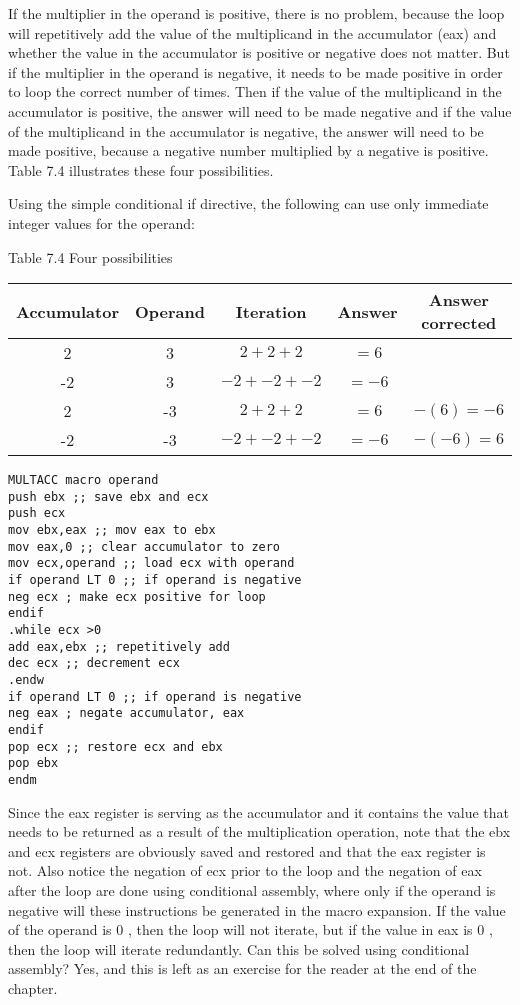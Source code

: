 \documentclass[10pt]{article}
\begin{document}
If the multiplier in the operand is positive, there is no problem, because the loop will repetitively add the value of the multiplicand in the accumulator (eax) and whether the value in the accumulator is positive or negative does not matter. But if the multiplier in the operand is negative, it needs to be made positive in order to loop the correct number of times. Then if the value of the multiplicand in the accumulator is positive, the answer will need to be made negative and if the value of the multiplicand in the accumulator is negative, the answer will need to be made positive, because a negative number multiplied by a negative is positive. Table 7.4 illustrates these four possibilities.

Using the simple conditional if directive, the following can use only immediate integer values for the operand:

Table 7.4 Four possibilities

\begin{center}
\begin{tabular}{|c|c|c|c|c|}
\hline
Accumulator & Operand & Iteration & Answer & Answer corrected \\
\hline
2 & 3 & $2+2+2$ & $=6$ &  \\
\hline
-2 & 3 & $-2+-2+-2$ & $=-6$ &  \\
\hline
2 & -3 & $2+2+2$ & $=6$ & $-(6)=-6$ \\
\hline
-2 & -3 & $-2+-2+-2$ & $=-6$ & $-(-6)=6$ \\
\hline
\end{tabular}
\end{center}

\begin{verbatim}
MULTACC macro operand
push ebx ;; save ebx and ecx
push ecx
mov ebx,eax ;; mov eax to ebx
mov eax,0 ;; clear accumulator to zero
mov ecx,operand ;; load ecx with operand
if operand LT 0 ;; if operand is negative
neg ecx ; make ecx positive for loop
endif
.while ecx >0
add eax,ebx ;; repetitively add
dec ecx ;; decrement ecx
.endw
if operand LT 0 ;; if operand is negative
neg eax ; negate accumulator, eax
endif
pop ecx ;; restore ecx and ebx
pop ebx
endm
\end{verbatim}

Since the eax register is serving as the accumulator and it contains the value that needs to be returned as a result of the multiplication operation, note that the ebx and ecx registers are obviously saved and restored and that the eax register is not. Also notice the negation of ecx prior to the loop and the negation of eax after the loop are done using conditional assembly, where only if the operand is negative will these instructions be generated in the macro expansion. If the value of the operand is 0 , then the loop will not iterate, but if the value in eax is 0 , then the loop will iterate redundantly. Can this be solved using conditional assembly? Yes, and this is left as an exercise for the reader at the end of the chapter.
\end{document}
